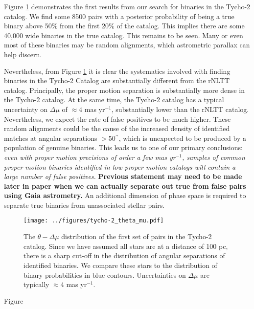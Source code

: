 \documentclass[usenatbib]{mnras}
\newcommand{\asec}{\ifmmode {^{\prime\prime}}\else$^{\prime\prime}$\fi}
\begin{document}
Figure \ref{fig:tycho-2_theta_mu} demonstrates the first results from our search for binaries in the Tycho-2 catalog. We find some 8500 pairs with a posterior probability of being a true binary above 50\% from the first 20\% of the catalog. This implies there are some 40,000 wide binaries in the true catalog. This remains to be seen. Many or even most of these binaries may be random alignments, which astrometric parallax can help discern. 

Nevertheless, from Figure \ref{fig:tycho-2_theta_mu} it is clear the systematics involved with finding binaries in the Tycho-2 Catalog are substantially different from the rNLTT catalog. Principally, the proper motion separation is substantially more dense in the Tycho-2 catalog. At the same time, the Tycho-2 catalog has a typical uncertainty on $\Delta \mu$ of $\approx4$ mas yr$^{-1}$, substantially lower than the rNLTT catalog. Nevertheless, we expect the rate of false positives to be much higher. These random alignments could be the cause of the increased density of identified matches at angular separations $>$50\asec, which is unexpected to be produced by a population of genuine binaries. This leads us to one of our primary conclusions: {\it even with proper motion precisions of order a few mas yr$^{-1}$, samples of common proper motion binaries identified in low proper motion catalogs will contain a large number of false positives. } {\bf Previous statement may need to be made later in paper when we can actually separate out true from false pairs using Gaia astrometry.} An additional dimension of phase space is required to separate true binaries from unassociated stellar pairs.



\begin{figure}
\begin{center}
\texttt{[image: ../figures/tycho-2\_theta\_mu.pdf]}
\caption{ The $\theta-\Delta \mu$ distribution of the first set of pairs in the Tycho-2 catalog. Since we have assumed all stars are at a distance of 100 pc, there is a sharp cut-off in the distribution of angular separations of identified binaries. We compare these stars to the distribution of binary probabilities in blue contours. Uncertainties on $\Delta \mu$ are typically $\approx$4 mas yr$^{-1}$. }
\label{fig:tycho-2_theta_mu}
\end{center}
\end{figure}



Figure 
\end{document}

